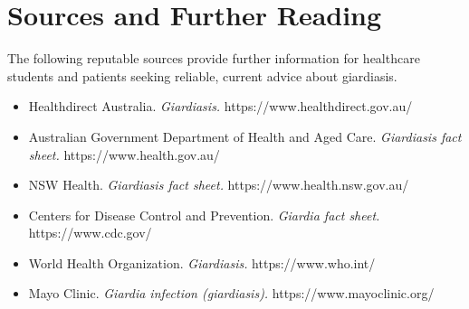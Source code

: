 \section*{Sources and Further Reading}
The following reputable sources provide further information for healthcare students and patients seeking reliable, current advice about giardiasis.

\begin{itemize}
    \item Healthdirect Australia. \textit{Giardiasis.} https://www.healthdirect.gov.au/
    \item Australian Government Department of Health and Aged Care. \textit{Giardiasis fact sheet.} https://www.health.gov.au/
    \item NSW Health. \textit{Giardiasis fact sheet.} https://www.health.nsw.gov.au/
    \item Centers for Disease Control and Prevention. \textit{Giardia fact sheet.} https://www.cdc.gov/
    \item World Health Organization. \textit{Giardiasis.} https://www.who.int/
    \item Mayo Clinic. \textit{Giardia infection (giardiasis).} https://www.mayoclinic.org/
\end{itemize}
